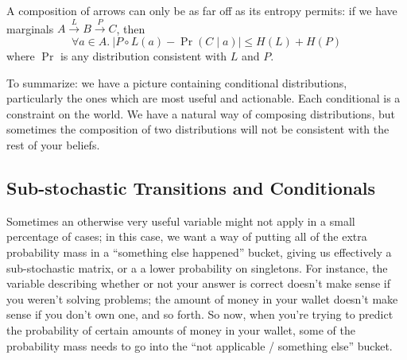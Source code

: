 \documentclass{article}
\begin{document}
	\begin{conj}
		A composition of arrows can only be as far off as its entropy permits: if we have marginals $A \xrightarrow{L} B \xrightarrow{P} C$, then
		\[ \forall a \in A.~ \Big|  P\circ L (a) - \Pr(C \mid a) \Big|  \leq H(L) + H(P) \]
		where $\Pr$ is any distribution consistent with $L$ and $P$.
	\end{conj}

	To summarize: we have a picture containing conditional distributions, particularly the ones which are most useful and actionable. Each conditional is a constraint on the world. We have a natural way of composing distributions, but sometimes the composition of two distributions will not be consistent with the rest of your beliefs.	
	
	
	\subsection{Sub-stochastic Transitions and Conditionals} \label{sec:substochastic}
	
	Sometimes an otherwise very useful variable might not apply in a small percentage of cases; in this case, we want a way of putting all of the extra probability mass in a ``something else happened'' bucket, giving us effectively a sub-stochastic matrix, or a a lower probability on singletons. For instance, the variable describing whether or not your answer is correct doesn't make sense if you weren't solving problems; the amount of money in your wallet doesn't make sense if you don't own one, and so forth. So now, when you're trying to predict the probability of certain amounts of money in your wallet, some of the probability mass needs to go into the ``not applicable / something else'' bucket. 
	
\end{document}
